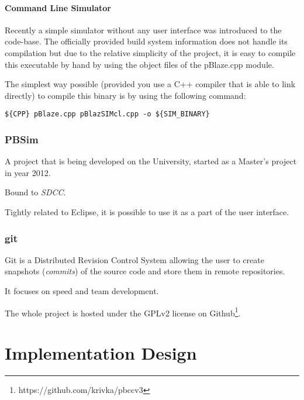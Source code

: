             \subsubsection{Command Line Simulator}

            Recently a simple simulator without any user interface was introduced to the code-base. The officially provided build system information does not handle its compilation but due to the relative simplicity of the project, it is easy to compile this executable by hand by using the object files of the pBlaze.cpp module.

            The simplest way possible (provided you use a C++ compiler that is able to link directly) to compile this binary is by using the following command:

            \begin{center}
                \texttt{\$\{CPP\} pBlaze.cpp pBlazSIMcl.cpp -o \$\{SIM\_BINARY\}}
            \end{center}

        \subsection{PBSim}\label{pbsim}


        A project that is being developed on the University, started as a Master's project in year 2012.

        Bound to \emph{SDCC}.

        Tightly related to Eclipse, it is possible to use it as a part of the user interface.

        \subsection{git}\label{git}

        Git is a Distributed Revision Control System allowing the user to create snapshots (\emph{commits}) of the source code and store them in remote repositories.

        It focuses on speed and team development. 

        The whole project is hosted under the GPLv2 license on Github\footnote{https://github.com/krivka/pbccv3}.

        


\chapter{Implementation Design}\label{design}

